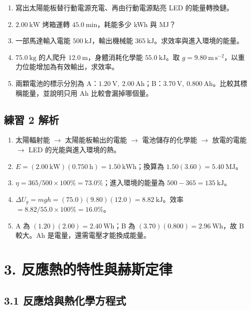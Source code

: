 \documentclass[11pt,a4paper]{article}
\providecommand{\tightlist}{%
  \setlength{\itemsep}{0pt}\setlength{\parskip}{0pt}}
\begin{document}
\begin{enumerate}
\def\labelenumi{\arabic{enumi}.}
\tightlist
\item
  寫出太陽能板替行動電源充電、再由行動電源點亮 LED 的能量轉換鏈。
\item
  \(2.00\ \mathrm{kW}\) 烤箱運轉 \(45.0\ \mathrm{min}\)，耗能多少 kWh 與 MJ？
\item
  一部馬達輸入電能 \(500\ \mathrm{kJ}\)，輸出機械能 \(365\ \mathrm{kJ}\)。求效率與進入環境的能量。
\item
  \(75.0\ \mathrm{kg}\) 的人爬升 \(12.0\ \mathrm m\)，身體消耗化學能 \(55.0\ \mathrm{kJ}\)。取 \(g=9.80\ \mathrm{m\,s^{-2}}\)，以重力位能增加為有效輸出，求效率。
\item
  兩顆電池的標示分別為 A：\(1.20\ \mathrm V,\ 2.00\ \mathrm{Ah}\)；B：\(3.70\ \mathrm V,\ 0.800\ \mathrm{Ah}\)。比較其標稱能量，並說明只用 Ah 比較會漏掉哪個量。
\end{enumerate}

\subsection{練習 2 解析}\label{ux7df4ux7fd2-2-ux89e3ux6790}

\begin{enumerate}
\def\labelenumi{\arabic{enumi}.}
\tightlist
\item
  太陽輻射能 \(\rightarrow\) 太陽能板輸出的電能 \(\rightarrow\) 電池儲存的化學能 \(\rightarrow\) 放電的電能 \(\rightarrow\) LED 的光能與進入環境的熱。
\item
  \(E=(2.00\ \mathrm{kW})(0.750\ \mathrm h)=1.50\ \mathrm{kWh}\)；換算為 \(1.50(3.60)=5.40\ \mathrm{MJ}\)。
\item
  \(\eta=365/500\times100\%=73.0\%\)；進入環境的能量為 \(500-365=135\ \mathrm{kJ}\)。
\item
  \(\Delta U_g=mgh=(75.0)(9.80)(12.0)=8.82\ \mathrm{kJ}\)。效率 \(=8.82/55.0\times100\%=16.0\%\)。
\item
  A 為 \((1.20)(2.00)=2.40\ \mathrm{Wh}\)；B 為 \((3.70)(0.800)=2.96\ \mathrm{Wh}\)，故 B 較大。Ah 是電量，還需電壓才能換成能量。
\end{enumerate}

\section{3. 反應熱的特性與赫斯定律}\label{ux53cdux61c9ux71b1ux7684ux7279ux6027ux8207ux8d6bux65afux5b9aux5f8b}

\subsection{3.1 反應焓與熱化學方程式}\label{ux53cdux61c9ux7113ux8207ux71b1ux5316ux5b78ux65b9ux7a0bux5f0f}
\end{document}
